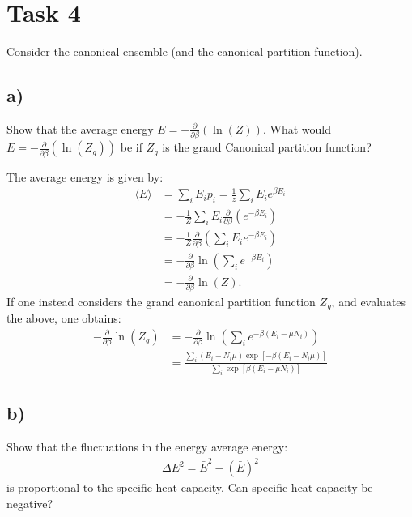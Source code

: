 \documentclass[a4paper]{article}
\newcommand{\average}[1]{\langle #1 \rangle}
\newcommand{\newparagraph}{\vspace{.5cm}\noindent}
\begin{document}
\section*{Task 4}
Consider the canonical ensemble (and the canonical partition function).

\subsection*{a)}
Show that the average energy $E = -\frac{\partial}{\partial \beta}\left(\ln(Z)\right)$. What would $E = -\frac{\partial}{\partial \beta}\left(\ln(Z_g)\right)$ be if $Z_g$ is the grand Canonical partition function?

\newparagraph
The average energy is given by:
\begin{align*}
    \average{E} &= \sum_i E_i p_i = \frac{1}{z}\sum_i E_i e^{\beta E_i}\\
    &= -\frac{1}{Z}\sum_i E_i \frac{\partial}{\partial \beta}\left(e^{-\beta E_i}\right)\\
    &= -\frac{1}{Z}\frac{\partial}{\partial \beta}\left(\sum_i E_i e^{-\beta E_i}\right)\\
    &= -\frac{\partial}{\partial \beta}\ln\left(\sum_i e^{-\beta E_i}\right)\\
    &= -\frac{\partial}{\partial \beta}\ln(Z).
\end{align*}If one instead considers the grand canonical partition function $Z_g$, and evaluates the above, one obtains:
\begin{align*}
    -\frac{\partial}{\partial \beta}\ln(Z_g) &= -\frac{\partial}{\partial \beta}\ln\left(\sum_i e^{-\beta(E_i - \mu N_i)}\right)\\
    &= \frac{\sum_i (E_i - N_i\mu)\exp\left[-\beta(E_i-N_i\mu)\right]}{\sum_i \exp\left[\beta(E_i - \mu N_i)\right]}
\end{align*}

\subsection*{b)}
Show that the fluctuations in the energy average energy:
\begin{align*}
    \Delta E^2 = \bar{E}^2 - \left(\bar{E}\right)^2
\end{align*}is proportional to the specific heat capacity. Can specific heat capacity be negative?
\end{document}
